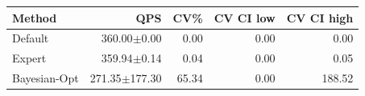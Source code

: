 \begin{tabular}{lrrrr}
\hline
Method & QPS & CV\% & CV CI low & CV CI high \\
\hline
Default & 360.00$\pm$0.00 & 0.00 & 0.00 & 0.00 \\
Expert & 359.94$\pm$0.14 & 0.04 & 0.00 & 0.05 \\
Bayesian-Opt & 271.35$\pm$177.30 & 65.34 & 0.00 & 188.52 \\
\hline
\end{tabular}